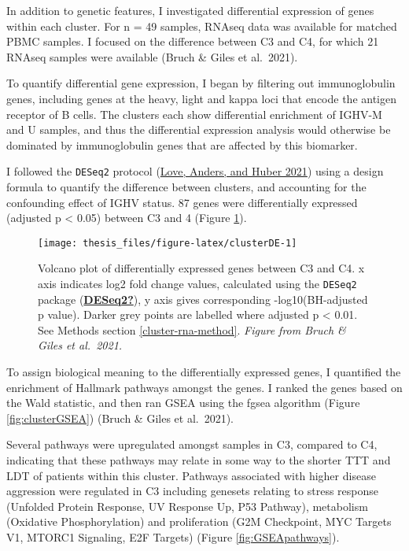 \documentclass[11pt, a4paper, twosided]{book}
\begin{document}
In addition to genetic features, I investigated differential expression of genes within each cluster. For n = 49 samples, RNAseq data was available for matched PBMC samples. I focused on the difference between C3 and C4, for which 21 RNAseq samples were available (Bruch \& Giles et al.~2021).

To quantify differential gene expression, I began by filtering out immunoglobulin genes, including genes at the heavy, light and kappa loci that encode the antigen receptor of B cells. The clusters each show differential enrichment of IGHV-M and U samples, and thus the differential expression analysis would otherwise be dominated by immunoglobulin genes that are affected by this biomarker.

I followed the \texttt{DESeq2} protocol (\protect\hyperlink{ref-R-DESeq2}{Love, Anders, and Huber 2021}) using a design formula to quantify the difference between clusters, and accounting for the confounding effect of IGHV status. 87 genes were differentially expressed (adjusted p \textless{} 0.05) between C3 and 4 (Figure \ref{fig:clusterDE}).


\begin{figure}

{\centering \texttt{[image: thesis\_files/figure-latex/clusterDE-1]} 

}

\caption{Volcano plot of differentially expressed genes between C3 and C4. x axis indicates log2 fold change values, calculated using the \texttt{DESeq2} package (\protect\hyperlink{ref-DESeq2}{\textbf{DESeq2?}}), y axis gives corresponding -log10(BH-adjusted p value). Darker grey points are labelled where adjusted p \textless{} 0.01. See Methods section \ref{cluster-rna-method}. \emph{Figure from Bruch \& Giles et al.~2021.}}\label{fig:clusterDE}
\end{figure}
To assign biological meaning to the differentially expressed genes, I quantified the enrichment of Hallmark pathways amongst the genes. I ranked the genes based on the Wald statistic, and then ran GSEA using the fgsea algorithm (Figure \ref{fig:clusterGSEA}) (Bruch \& Giles et al.~2021).

Several pathways were upregulated amongst samples in C3, compared to C4, indicating that these pathways may relate in some way to the shorter TTT and LDT of patients within this cluster. Pathways associated with higher disease aggression were regulated in C3 including genesets relating to stress response (Unfolded Protein Response, UV Response Up, P53 Pathway), metabolism (Oxidative Phosphorylation) and proliferation (G2M Checkpoint, MYC Targets V1, MTORC1 Signaling, E2F Targets) (Figure \ref{fig:GSEApathways}).
\end{document}
